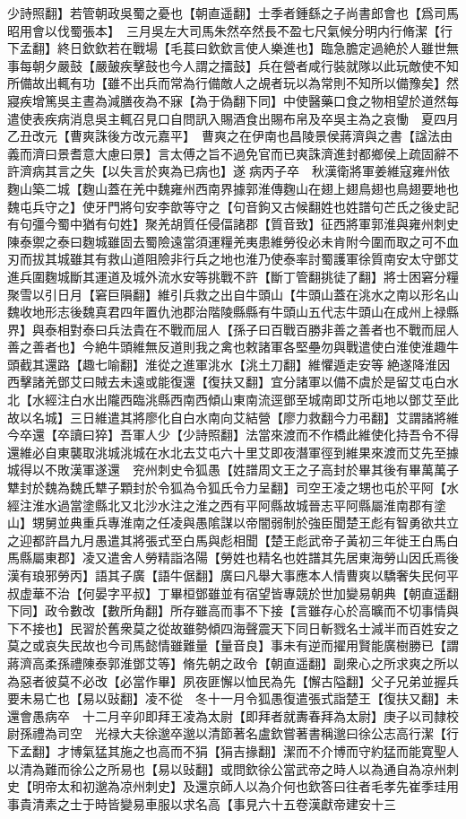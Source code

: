 少詩照翻】若管朝政吳蜀之憂也【朝直遥翻】士季者鍾繇之子尚書郎會也【爲司馬昭用會以伐蜀張本】　三月吳左大司馬朱然卒然長不盈七尺氣候分明内行脩潔【行下孟翻】終日欽欽若在戰場【毛萇曰欽欽言使人樂進也】臨急膽定過絶於人雖世無事每朝夕嚴鼓【嚴皷疾擊鼓也今人謂之擂鼓】兵在營者咸行裝就隊以此玩敵使不知所備故出輒有功【雖不出兵而常為行備敵人之覘者玩以為常則不知所以備豫矣】然寢疾增篤吳主晝為減膳夜為不寐【為于偽翻下同】中使醫藥口食之物相望於道然每遣使表疾病消息吳主輒召見口自問訊入賜酒食出賜布帛及卒吳主為之哀慟　夏四月乙丑改元【曹爽誅後方改元嘉平】　曹爽之在伊南也昌陵景侯蔣濟與之書【諡法由義而濟曰景耆意大慮曰景】言太傅之旨不過免官而已爽誅濟進封都鄉侯上疏固辭不許濟病其言之失【以失言於爽為已病也】遂病丙子卒　秋漢衛將軍姜維寇雍州依麴山築二城【麴山蓋在羌中魏雍州西南界據郭淮傳麴山在翅上翅鳥翅也鳥翅要地也魏屯兵守之】使牙門將句安李歆等守之【句音鉤又古候翻姓也姓譜句芒氏之後史記有句彊今蜀中猶有句姓】聚羌胡質任侵偪諸郡【質音致】征西將軍郭淮與雍州刺史陳泰禦之泰曰麴城雖固去蜀險遠當須運糧羌夷患維勞役必未肯附今圍而取之可不血刃而拔其城雖其有救山道阻險非行兵之地也淮乃使泰率討蜀護軍徐質南安太守鄧艾進兵圍麴城斷其運道及城外流水安等挑戰不許【斷丁管翻挑徒了翻】將士困窘分糧聚雪以引日月【窘巨隕翻】維引兵救之出自牛頭山【牛頭山蓋在洮水之南以形名山魏收地形志後魏真君四年置仇池郡治階陵縣縣有牛頭山五代志牛頭山在成州上禄縣界】與泰相對泰曰兵法貴在不戰而屈人【孫子曰百戰百勝非善之善者也不戰而屈人善之善者也】今絶牛頭維無反道則我之禽也敕諸軍各堅壘勿與戰遣使白淮使淮趣牛頭截其還路【趣七喻翻】淮從之進軍洮水【洮土刀翻】維懼遁走安等絶遂降淮因西擊諸羌鄧艾曰賊去未遠或能復還【復扶又翻】宜分諸軍以備不虞於是留艾屯白水北【水經注白水出隴西臨洮縣西南西傾山東南流逕鄧至城南即艾所屯地以鄧艾至此故以名城】三日維遣其將廖化自白水南向艾結營【廖力救翻今力弔翻】艾謂諸將維今卒還【卒讀曰猝】吾軍人少【少詩照翻】法當來渡而不作橋此維使化持吾令不得還維必自東襲取洮城洮城在水北去艾屯六十里艾即夜潛軍徑到維果來渡而艾先至據城得以不敗漢軍遂還　兖州刺史令狐愚【姓譜周文王之子高封於畢其後有畢萬萬子犨封於魏為魏氏犨子顆封於令狐為令狐氏令力呈翻】司空王凌之甥也屯於平阿【水經注淮水過當塗縣北又北沙水注之淮之西有平阿縣故城晉志平阿縣屬淮南郡有塗山】甥舅並典重兵專淮南之任凌與愚隂謀以帝闇弱制於強臣聞楚王彪有智勇欲共立之迎都許昌九月愚遣其將張式至白馬與彪相聞【楚王彪武帝子黃初三年徙王白馬白馬縣屬東郡】凌又遣舍人勞精詣洛陽【勞姓也精名也姓譜其先居東海勞山因氏焉後漢有琅邪勞丙】語其子廣【語牛倨翻】廣曰凡舉大事應本人情曹爽以驕奢失民何平叔虚華不治【何晏字平叔】丁畢桓鄧雖並有宿望皆專競於世加變易朝典【朝直遥翻下同】政令數改【數所角翻】所存雖高而事不下接【言雖存心於高曠而不切事情與下不接也】民習於舊衆莫之從故雖勢傾四海聲震天下同日斬戮名士減半而百姓安之莫之或哀失民故也今司馬懿情雖難量【量音良】事未有逆而擢用賢能廣樹勝已【謂蔣濟高柔孫禮陳泰郭淮鄧艾等】脩先朝之政令【朝直遥翻】副衆心之所求爽之所以為惡者彼莫不必改【必當作畢】夙夜匪懈以恤民為先【懈古隘翻】父子兄弟並握兵要未易亡也【易以䜴翻】凌不從　冬十一月令狐愚復遣張式詣楚王【復扶又翻】未還會愚病卒　十二月辛卯即拜王凌為太尉【即拜者就夀春拜為太尉】庚子以司隸校尉孫禮為司空　光禄大夫徐邈卒邈以清節著名盧欽嘗著書稱邈曰徐公志高行潔【行下孟翻】才博氣猛其施之也高而不狷【狷吉掾翻】潔而不介博而守約猛而能寛聖人以清為難而徐公之所易也【易以䜴翻】或問欽徐公當武帝之時人以為通自為凉州刺史【明帝太和初邈為凉州刺史】及還京師人以為介何也欽答曰往者毛孝先崔季珪用事貴清素之士于時皆變易車服以求名高【事見六十五卷漢獻帝建安十三